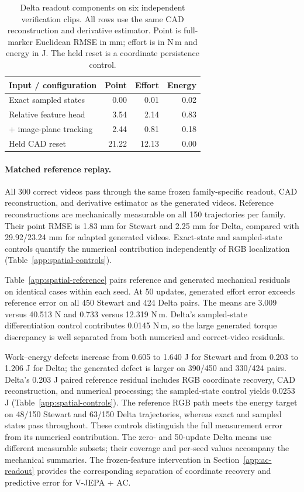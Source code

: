 \begin{table}[t]
\caption{Delta readout components on six independent verification clips. All rows use the same CAD reconstruction and derivative estimator. Point is full-marker Euclidean RMSE in mm; effort is in N\,m and energy in J. The held reset is a coordinate persistence control.}
\label{app:delta-components}
\centering\small
\setlength{\tabcolsep}{3pt}
\begin{tabular}{lrrr}
\toprule
Input / configuration & Point & Effort & Energy\\
\midrule
Exact sampled states & 0.00 & 0.01 & 0.02 \\
Relative feature head & 3.54 & 2.14 & 0.83 \\
+ image-plane tracking & 2.44 & 0.81 & 0.18 \\
Held CAD reset & 21.22 & 12.13 & 0.00 \\
\bottomrule
\end{tabular}
\end{table}

\paragraph{Matched reference replay.}
All 300 correct videos pass through the same frozen family-specific readout, CAD reconstruction, and derivative estimator as the generated videos. Reference reconstructions are mechanically measurable on all 150 trajectories per family. Their point RMSE is 1.83 mm for Stewart and 2.25 mm for Delta, compared with 29.92/23.24 mm for adapted generated videos. Exact-state and sampled-state controls quantify the numerical contribution independently of RGB localization (Table~\ref{app:spatial-controls}).

Table~\ref{app:spatial-reference} pairs reference and generated mechanical residuals on identical cases within each seed. At 50 updates, generated effort error exceeds reference error on all 450 Stewart and 424 Delta pairs. The means are 3.009 versus 40.513 N and 0.733 versus 12.319 N\,m. Delta's sampled-state differentiation control contributes 0.0145 N\,m, so the large generated torque discrepancy is well separated from both numerical and correct-video residuals.

Work--energy defects increase from 0.605 to 1.640 J for Stewart and from 0.203 to 1.206 J for Delta; the generated defect is larger on 390/450 and 330/424 pairs. Delta's 0.203 J paired reference residual includes RGB coordinate recovery, CAD reconstruction, and numerical processing; the sampled-state control yields 0.0253 J (Table~\ref{app:spatial-controls}). The reference RGB path meets the energy target on 48/150 Stewart and 63/150 Delta trajectories, whereas exact and sampled states pass throughout. These controls distinguish the full measurement error from its numerical contribution. The zero- and 50-update Delta means use different measurable subsets; their coverage and per-seed values accompany the mechanical summaries. The frozen-feature intervention in Section~\ref{app:ac-readout} provides the corresponding separation of coordinate recovery and predictive error for V-JEPA + AC.

